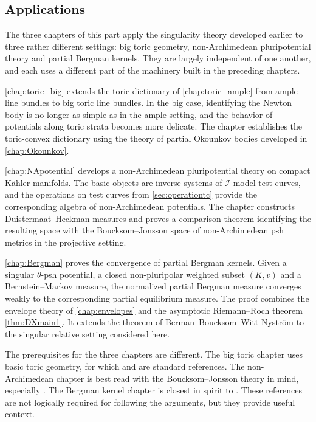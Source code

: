 \begin{partbacktext}
\part{Applications}
\noindent
The three chapters of this part apply the singularity theory developed earlier to three rather different settings: big toric geometry, non-Archimedean pluripotential theory and partial Bergman kernels. They are largely independent of one another, and each uses a different part of the machinery built in the preceding chapters.

\cref{chap:toric_big} extends the toric dictionary of \cref{chap:toric_ample} from ample line bundles to big toric line bundles. In the big case, identifying the Newton body is no longer as simple as in the ample setting, and the behavior of potentials along toric strata becomes more delicate. The chapter establishes the toric-convex dictionary using the theory of partial Okounkov bodies developed in \cref{chap:Okounkov}.

\cref{chap:NApotential} develops a non-Archimedean pluripotential theory on compact K\"ahler manifolds. The basic objects are inverse systems of $\mathcal I$-model test curves, and the operations on test curves from \cref{sec:operationtc} provide the corresponding algebra of non-Archimedean potentials. The chapter constructs Duistermaat--Heckman measures and proves a comparison theorem identifying the resulting space with the Boucksom--Jonsson space of non-Archimedean psh metrics in the projective setting.

\cref{chap:Bergman} proves the convergence of partial Bergman kernels. Given a singular $\theta$-psh potential, a closed non-pluripolar weighted subset $(K,v)$ and a Bernstein--Markov measure, the normalized partial Bergman measure converges weakly to the corresponding partial equilibrium measure. The proof combines the envelope theory of \cref{chap:envelopes} and the asymptotic Riemann--Roch theorem \cref{thm:DXmain1}. It extends the theorem of Berman--Boucksom--Witt Nystr\"om \cite{BBWN11} to the singular relative setting considered here.

The prerequisites for the three chapters are different. The big toric chapter uses basic toric geometry, for which \cite{CLS11} and \cite{Fultor} are standard references. The non-Archimedean chapter is best read with the Boucksom--Jonsson theory in mind, especially \cite{BJ22}. The Bergman kernel chapter is closest in spirit to \cite{BBWN11}. These references are not logically required for following the arguments, but they provide useful context.
\end{partbacktext}
